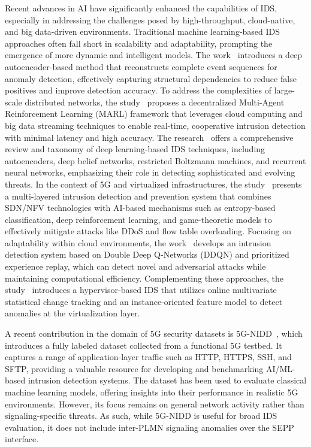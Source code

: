 \documentclass[journal,article,submit,moreauthors,pdftex]{Definitions/tsp}
\begin{document}
Recent advances in AI have significantly enhanced the capabilities of IDS, especially in addressing the challenges posed by high-throughput, cloud-native, and big data-driven environments. Traditional machine learning-based IDS approaches often fall short in scalability and adaptability, prompting the emergence of more dynamic and intelligent models. The work~\cite{yuanRecomposeEventSequences2021} introduces a deep autoencoder-based method that reconstructs complete event sequences for anomaly detection, effectively capturing structural dependencies to reduce false positives and improve detection accuracy. To address the complexities of large-scale distributed networks, the study~\cite{louatiBigIDSDecentralizedMulti2024} proposes a decentralized Multi-Agent Reinforcement Learning (MARL) framework that leverages cloud computing and big data streaming techniques to enable real-time, cooperative intrusion detection with minimal latency and high accuracy. The research~\cite{lanskyDeepLearningBasedIntrusion2021} offers a comprehensive review and taxonomy of deep learning-based IDS techniques, including autoencoders, deep belief networks, restricted Boltzmann machines, and recurrent neural networks, emphasizing their role in detecting sophisticated and evolving threats. In the context of 5G and virtualized infrastructures, the study~\cite{abdulqadderMultilayeredIntrusionDetection2020} presents a multi-layered intrusion detection and prevention system that combines SDN/NFV technologies with AI-based mechanisms such as entropy-based classification, deep reinforcement learning, and game-theoretic models to effectively mitigate attacks like DDoS and flow table overloading. Focusing on adaptability within cloud environments, the work~\cite{sethiRobustAdaptiveCloud2020} develops an intrusion detection system based on Double Deep Q-Networks (DDQN) and prioritized experience replay, which can detect novel and adversarial attacks while maintaining computational efficiency. Complementing these approaches, the study~\cite{aldribiHypervisorbasedCloudIntrusion2020} introduces a hypervisor-based IDS that utilizes online multivariate statistical change tracking and an instance-oriented feature model to detect anomalies at the virtualization layer.

A recent contribution in the domain of 5G security datasets is 5G-NIDD~\cite{samarakoon5GNIDDComprehensiveNetwork2022}, which introduces a fully labeled dataset collected from a functional 5G testbed. It captures a range of application-layer traffic such as HTTP, HTTPS, SSH, and SFTP, providing a valuable resource for developing and benchmarking AI/ML-based intrusion detection systems. The dataset has been used to evaluate classical machine learning models, offering insights into their performance in realistic 5G environments. However, its focus remains on general network activity rather than signaling-specific threats. As such, while 5G-NIDD is useful for broad IDS evaluation, it does not include inter-PLMN signaling anomalies over the SEPP interface.
\end{document}
